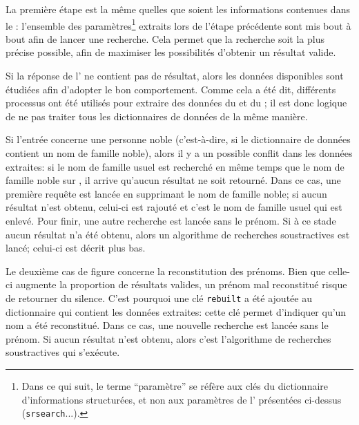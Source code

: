La première étape est la même quelles que soient les informations contenues dans le \tname{}: l'ensemble des paramètres\footnote{Dans ce qui suit, le terme \enquote{paramètre} se réfère aux clés du dictionnaire d'informations structurées, et non aux paramètres de l'\api{} présentées ci-dessus (\texttt{srsearch}...).} extraits lors de l'étape précédente sont mis bout à bout afin de lancer une recherche. Cela permet que la recherche soit la plus précise possible, afin de maximiser les possibilités d'obtenir un résultat valide.

Si la réponse de l'\api{} ne contient pas de résultat, alors les données disponibles sont étudiées afin d'adopter le bon comportement. Comme cela a été dit, différents processus ont été utilisés pour extraire des données du \tname{} et du \ttrait{}; il est donc logique de ne pas traiter tous les \glspl{dictionnaire} de données de la même manière.

Si l'entrée concerne une personne noble (c'est-à-dire, si le dictionnaire de données contient un nom de famille noble), alors il y a un possible conflit dans les données extraites: si le nom de famille usuel est recherché en même temps que le nom de famille noble sur \wkd{}, il arrive qu'aucun résultat ne soit retourné. Dans ce cas, une première requête est lancée en supprimant le nom de famille noble; si aucun résultat n'est obtenu, celui-ci est rajouté et c'est le nom de famille usuel qui est enlevé. Pour finir, une autre recherche est lancée sans le prénom. Si à ce stade aucun résultat n'a été obtenu, alors un algorithme de recherches soustractives est lancé; celui-ci est décrit plus bas.

Le deuxième cas de figure concerne la reconstitution des prénoms. Bien que celle-ci augmente la proportion de résultats valides, un prénom mal reconstitué risque de retourner du silence. C'est pourquoi une clé \texttt{rebuilt} a été ajoutée au \gls{dictionnaire} qui contient les données extraites: cette clé permet d'indiquer qu'un nom a été reconstitué. Dans ce cas, une nouvelle recherche est lancée sans le prénom. Si aucun résultat n'est obtenu, alors c'est l'algorithme de recherches soustractives qui s'exécute.

